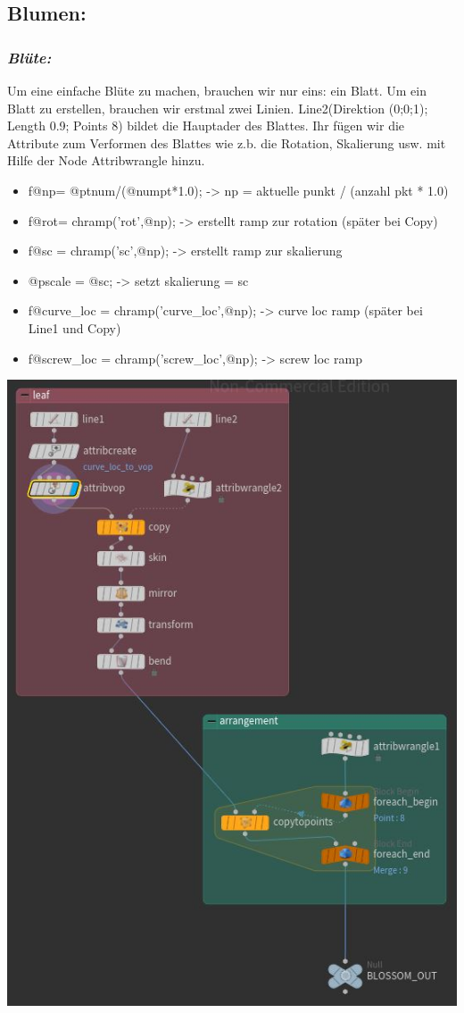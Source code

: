 \documentclass[paper=a4,fontsize=12pt,ngerman]{scrartcl}
\begin{document}
	\subsection*{Blumen:}
	\subsubsection*{\textit{Blüte:}}

	Um eine einfache Blüte zu machen, brauchen wir nur eins: ein Blatt. Um ein Blatt zu erstellen, brauchen wir erstmal zwei Linien. Line2(Direktion (0;0;1); Length 0.9; Points 8) bildet die Hauptader des Blattes. Ihr fügen wir die Attribute zum Verformen des Blattes wie z.b. die Rotation, Skalierung usw. mit Hilfe der Node Attribwrangle hinzu.
	\begin{itemize}
		\item f@np= @ptnum/(@numpt*1.0);     	 	-> np = aktuelle punkt / (anzahl pkt * 1.0)
		\item f@rot= chramp('rot',@np); 			-> erstellt ramp zur rotation (später bei Copy)
		\item f@sc = chramp('sc',@np);				-> erstellt ramp zur skalierung
		\item @pscale = @sc;					-> setzt skalierung = sc
		\item f@curve\_loc = chramp('curve\_loc',@np); 	-> curve loc ramp  (später bei Line1 und Copy)
		\item f@screw\_loc = chramp('screw\_loc',@np);	-> screw loc ramp
	\end{itemize}	
	\includegraphics*[scale=0.55]{graphics/blossom.JPG}
\end{document}

